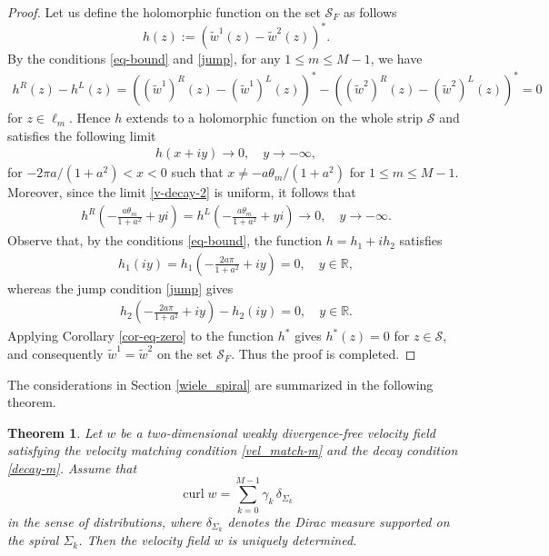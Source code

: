 \documentclass[11pt, letterpaper, reqno]{amsart}
\numberwithin{equation}{section}
\theoremstyle{definition}
\theoremstyle{plain}
\newtheorem{theorem}{Theorem}[section]
\numberwithin{equation}{section}
\def\R{\mathbb{R}}
\def\SS{\mathcal{S}}
\DeclareMathOperator{\curl}{curl}
\begin{document}
\begin{proof}
Let us define the holomorphic function on the set $\SS_{F}$ as follows
\begin{equation*}
h(z) := (\tilde w^1(z) - \tilde w^2(z))^{*}.
\end{equation*}
By the conditions \eqref{eq-bound} and \eqref{jump}, for any $1\le m \le M-1$, we have
\begin{align*}
h^{R}(z) - h^{L}(z) = ((\tilde w^1)^{R}(z) - (\tilde w^1)^{L}(z))^{*} - ((\tilde w^2)^{R}(z) - (\tilde w^2)^{L}(z))^{*} = 0
\end{align*}
for $z\in\ell_{m}$. Hence $h$ extends to a holomorphic function on the whole strip $\SS$ and satisfies the following limit
\begin{align*}
h(x+iy)\to 0, \quad y\to-\infty,
\end{align*}
for $-2\pi a/(1+a^{2}) <x <0$ such that $x\neq -a\theta_{m}/(1+a^{2})$ for $1\le m \le M-1$. Moreover, since the limit \eqref{v-decay-2} is uniform, it follows that
\begin{align*}
h^{R}\left(-\frac{a\theta_{m}}{1+a^{2}}+yi\right) = h^{L}\left(-\frac{a\theta_{m}}{1+a^{2}}+yi\right) \to 0, \quad y\to-\infty.
\end{align*}
Observe that, by the conditions \eqref{eq-bound}, the function $h = h_{1} + ih_{2}$ satisfies
\begin{align*}
h_{1}(iy) = h_{1}\left(-\frac{2a\pi}{1+a^2} + iy\right) = 0, \quad y\in\R,
\end{align*}
whereas the jump condition \eqref{jump} gives
\begin{align*}
h_{2}\left(-\frac{2a\pi}{1+a^2} + iy\right) - h_{2}(iy) = 0, \quad y\in\R.
\end{align*}
Applying Corollary \ref{cor-eq-zero} to the function $h^{*}$ gives $h^{*}(z) = 0$ for $z\in\SS$, and consequently $\tilde w^1 = \tilde w^2$ on the set $\SS_{F}$. Thus the proof is completed. 
\end{proof}
The considerations in Section \ref{wiele_spiral} are summarized in the following theorem.
\begin{theorem}\label{th-spiral-unique}
Let $w$ be a two-dimensional weakly divergence-free velocity field satisfying the velocity matching condition \eqref{vel_match-m} and the decay condition \eqref{decay-m}. Assume that 
\begin{equation}\label{curl-form}
\curl w = \sum_{k=0}^{M-1}\gamma_{k}\, \delta_{\Sigma_{k}}
\end{equation}
in the sense of distributions, where $\delta_{\Sigma_{k}}$ denotes the Dirac measure supported on the spiral $\Sigma_{k}$. Then the velocity field $w$ is uniquely determined. 
\end{theorem}
\end{document}
